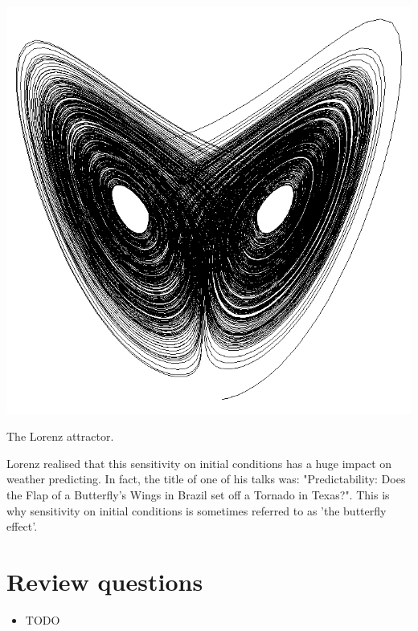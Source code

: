 \begin{marginfigure}
\centering
\includegraphics{dynamic/figures/lorenz}
\caption{The Lorenz attractor.}
\label{fig-lorenz}
\end{marginfigure} 


Lorenz realised that this sensitivity on initial conditions has a huge impact on weather predicting. In fact, the title of one of his talks was: "Predictability: Does the Flap of a Butterfly's Wings in Brazil set off a Tornado in Texas?". This is why sensitivity on initial conditions is sometimes referred to as 'the butterfly effect'.


\section*{Review questions}

\begin{itemize}
\item TODO 
\end{itemize}




